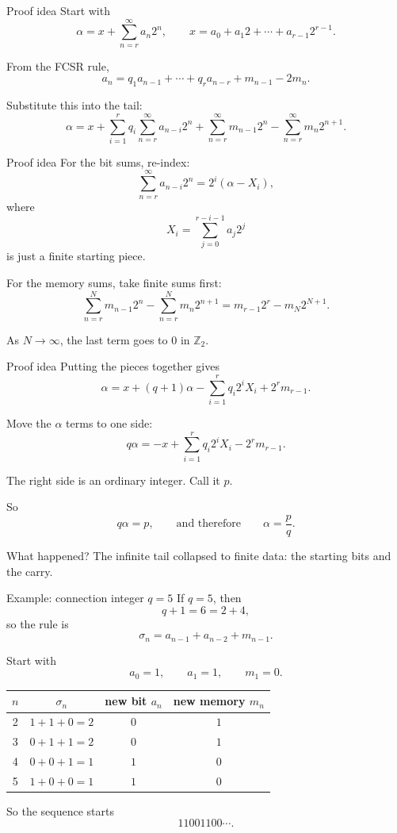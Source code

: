 \documentclass[aspectratio=169]{beamer}
\newcommand{\Ztwo}{\mathbb{Z}_2}
\begin{document}
\begin{frame}{Proof idea}
Start with
\[
  \alpha=x+\sum_{n=r}^{\infty}a_n2^n,
  \qquad
  x=a_0+a_1 2+\cdots+a_{r-1}2^{r-1}.
\]

From the FCSR rule,
\[
  a_n=q_1a_{n-1}+\cdots+q_ra_{n-r}+m_{n-1}-2m_n.
\]

Substitute this into the tail:
\[
\alpha=x+
\sum_{i=1}^r q_i\sum_{n=r}^{\infty}a_{n-i}2^n
+
\sum_{n=r}^{\infty}m_{n-1}2^n
-
\sum_{n=r}^{\infty}m_n2^{n+1}.
\]
\end{frame}

\begin{frame}{Proof idea}
For the bit sums, re-index:
\[
  \sum_{n=r}^{\infty}a_{n-i}2^n
  =2^i\left(\alpha-X_i\right),
\]
where
\[
  X_i=\sum_{j=0}^{r-i-1}a_j2^j
\]
is just a finite starting piece.

\vspace{0.2cm}
For the memory sums, take finite sums first:
\[
  \sum_{n=r}^{N}m_{n-1}2^n-
  \sum_{n=r}^{N}m_n2^{n+1}
  =m_{r-1}2^r-m_N2^{N+1}.
\]

As $N\to\infty$, the last term goes to $0$ in $\Ztwo$.
\end{frame}

\begin{frame}{Proof idea}
Putting the pieces together gives
\[
  \alpha=x+(q+1)\alpha-
  \sum_{i=1}^{r}q_i2^iX_i+2^rm_{r-1}.
\]

Move the $\alpha$ terms to one side:
\[
  q\alpha=-x+
  \sum_{i=1}^{r}q_i2^iX_i-2^rm_{r-1}.
\]

The right side is an ordinary integer. Call it $p$.

So
\[
  q\alpha=p,
  \qquad \text{and therefore}\qquad
  \alpha=\frac{p}{q}.
\]

\begin{block}{What happened?}
The infinite tail collapsed to finite data: the starting bits and the carry.
\end{block}
\end{frame}

\begin{frame}{Example: connection integer $q=5$}
If $q=5$, then
\[
  q+1=6=2+4,
\]
so the rule is
\[
  \sigma_n=a_{n-1}+a_{n-2}+m_{n-1}.
\]

Start with
\[
  a_0=1,\qquad a_1=1,\qquad m_1=0.
\]

\begin{center}
\begin{tabular}{c|c|c|c}
$n$ & $\sigma_n$ & new bit $a_n$ & new memory $m_n$ \\
\hline
2 & $1+1+0=2$ & $0$ & $1$ \\
3 & $0+1+1=2$ & $0$ & $1$ \\
4 & $0+0+1=1$ & $1$ & $0$ \\
5 & $1+0+0=1$ & $1$ & $0$
\end{tabular}
\end{center}

So the sequence starts
\[
  11001100\cdots.
\]
\end{frame}
\end{document}
